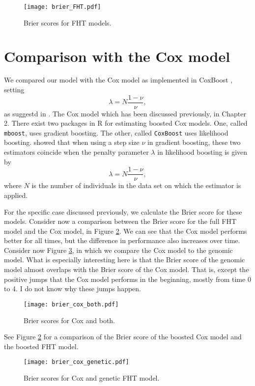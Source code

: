 \begin{figure}
\caption{Brier scores for FHT models.}
\label{fig:brier-FHT}
\centering\texttt{[image: brier\_FHT.pdf]}
\end{figure}

\section{Comparison with the Cox model}
We compared our model with the Cox model as implemented in CoxBoost \citep{...}, setting
\begin{equation}\label{eq:lambda-nu}
    \lambda=N\frac{1-\nu}{\nu},
\end{equation}
as suggestd in \citet{DeBin2016}.
The Cox model which has been discussed previously, in Chapter 2.
There exist two packages in R for estimating boosted Cox models.
One, called \verb|mboost|, uses gradient boosting.
The other, called \verb|CoxBoost| uses likelihood boosting.
\citet{DeBin2016} showed that when using a step size $\nu$ in gradient boosting, these two estimators coincide when the penalty parameter $\lambda$ in likelihood boosting is given by
\begin{equation}\label{eq:lambda-nu}
    \lambda=N\frac{1-\nu}{\nu},
\end{equation}
where $N$ is the number of individuals in the data set on which the estimator is applied.

For the specific case discussed previously, we calculate the Brier score for these models.
Consider now a comparison between the Brier score for the full FHT model and the Cox model, in Figure \ref{fig:brier-cox-both}.
We can see that the Cox model performs better for all times, but the difference in performance also increases over time.
Consider now Figure \ref{fig:brier-cox-genetic}, in which we compare the Cox model to the genomic model.
What is especially interesting here is that the Brier score of the genomic model almost overlaps with the Brier score of the Cox model.
That is, except the positive jumps that the Cox model performs in the beginning, mostly from time 0 to 4.
I do not know why these jumps happen.

\begin{figure}
\caption{Brier scores for Cox and both.}
\label{fig:brier-cox-both}
\centering\texttt{[image: brier\_cox\_both.pdf]}
\end{figure}
See Figure \ref{fig:brier-cox-both} for a comparison of the Brier score of the boosted Cox model and the boosted FHT model.
\begin{figure}
\caption{Brier scores for Cox and genetic FHT model.}
\label{fig:brier-cox-genetic}
\centering
\texttt{[image: brier\_cox\_genetic.pdf]}
\end{figure}

